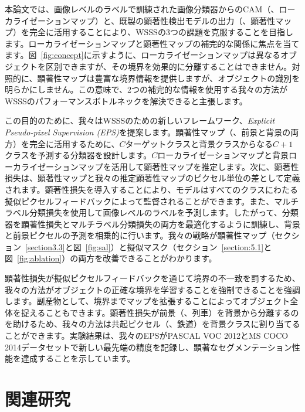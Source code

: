 \documentclass[final]{cvpr}
\begin{document}
本論文では、画像レベルのラベルで訓練された画像分類器からのCAM（\ie、ローカライゼーションマップ）と、既製の顕著性検出モデルの出力（\ie、顕著性マップ）を完全に活用することにより、WSSSの3つの課題を克服することを目指します。ローカライゼーションマップと顕著性マップの補完的な関係に焦点を当てます。図~\ref{fig:concept}に示すように、ローカライゼーションマップは異なるオブジェクトを区別できますが、その境界を効果的に分離することはできません。対照的に、顕著性マップは豊富な境界情報を提供しますが、オブジェクトの識別を明らかにしません。この意味で、2つの補完的な情報を使用する我々の方法がWSSSのパフォーマンスボトルネックを解決できると主張します。

この目的のために、我々はWSSSのための新しいフレームワーク、\emph{Explicit Pseudo-pixel Supervision (EPS)}を提案します。顕著性マップ（\ie、前景と背景の両方）を完全に活用するために、$C$ターゲットクラスと背景クラスからなる$C+1$クラスを予測する分類器を設計します。$C$ローカライゼーションマップと背景ローカライゼーションマップを活用して顕著性マップを推定します。次に、顕著性損失は、顕著性マップと我々の推定顕著性マップのピクセル単位の差として定義されます。顕著性損失を導入することにより、モデルはすべてのクラスにわたる擬似ピクセルフィードバックによって監督されることができます。また、マルチラベル分類損失を使用して画像レベルのラベルを予測します。したがって、分類器を顕著性損失とマルチラベル分類損失の両方を最適化するように訓練し、背景と前景ピクセルの予測を相乗的に行います。我々の戦略が顕著性マップ（セクション~\ref{section3.3}と図~\ref{fig:sal}）と擬似マスク（セクション~\ref{section:5.1}と図~\ref{fig:ablation}）の両方を改善できることがわかります。

顕著性損失が擬似ピクセルフィードバックを通じて境界の不一致を罰するため、我々の方法がオブジェクトの正確な境界を学習することを強制できることを強調します。副産物として、境界までマップを拡張することによってオブジェクト全体を捉えることもできます。顕著性損失が前景（\eg、列車）を背景から分離するのを助けるため、我々の方法は共起ピクセル（\eg、鉄道）を背景クラスに割り当てることができます。実験結果は、我々のEPSがPASCAL VOC 2012とMS COCO 2014データセットで新しい最先端の精度を記録し、顕著なセグメンテーション性能を達成することを示しています。

\section{関連研究}
\end{document}
